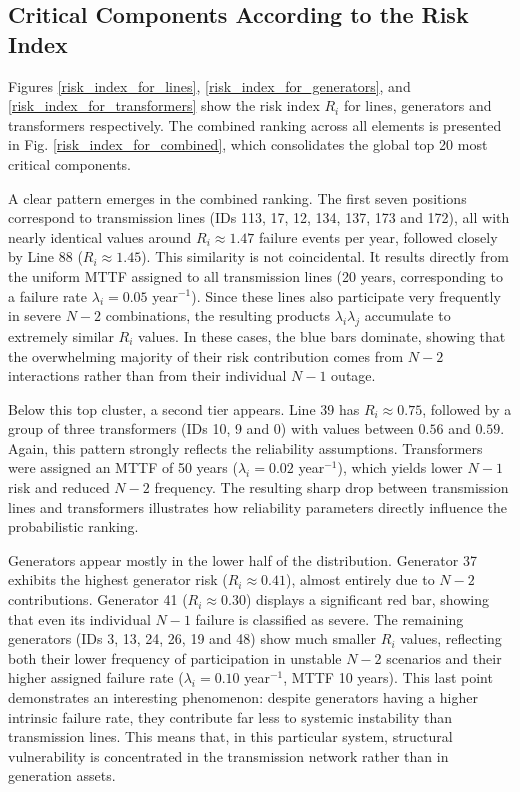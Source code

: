 \documentclass[journal]{IEEEtran}
\begin{document}
\subsection{Critical Components According to the Risk Index}

Figures \ref{risk_index_for_lines}, \ref{risk_index_for_generators}, and \ref{risk_index_for_transformers} show the risk index $R_i$ for lines, generators and transformers respectively. The combined ranking across all elements is presented in Fig. \ref{risk_index_for_combined}, which consolidates the global top 20 most critical components.

A clear pattern emerges in the combined ranking. The first seven positions correspond to transmission lines (IDs 113, 17, 12, 134, 137, 173 and 172), all with nearly identical values around $R_i \approx \num{1.47}$ failure events per year, followed closely by Line 88 ($R_i \approx \num{1.45}$). This similarity is not coincidental. It results directly from the uniform MTTF assigned to all transmission lines (20 years, corresponding to a failure rate $\lambda_i = 0.05$ year$^{-1}$). Since these lines also participate very frequently in severe $N-2$ combinations, the resulting products $\lambda_i \lambda_j$ accumulate to extremely similar $R_i$ values. In these cases, the blue bars dominate, showing that the overwhelming majority of their risk contribution comes from $N-2$ interactions rather than from their individual $N-1$ outage.

Below this top cluster, a second tier appears. Line 39 has $R_i \approx 0.75$, followed by a group of three transformers (IDs 10, 9 and 0) with values between $0.56$ and $0.59$. Again, this pattern strongly reflects the reliability assumptions. Transformers were assigned an MTTF of 50 years ($\lambda_i = 0.02$ year$^{-1}$), which yields lower $N-1$ risk and reduced $N-2$ frequency. The resulting sharp drop between transmission lines and transformers illustrates how reliability parameters directly influence the probabilistic ranking.

Generators appear mostly in the lower half of the distribution. Generator 37 exhibits the highest generator risk ($R_i \approx \num{0.41}$), almost entirely due to $N-2$ contributions. Generator 41 ($R_i \approx \num{0.30}$) displays a significant red bar, showing that even its individual $N-1$ failure is classified as severe. The remaining generators (IDs 3, 13, 24, 26, 19 and 48) show much smaller $R_i$ values, reflecting both their lower frequency of participation in unstable $N-2$ scenarios and their higher assigned failure rate ($\lambda_i = 0.10$ year$^{-1}$, MTTF 10 years). This last point demonstrates an interesting phenomenon: despite generators having a higher intrinsic failure rate, they contribute far less to systemic instability than transmission lines. This means that, in this particular system, structural vulnerability is concentrated in the transmission network rather than in generation assets.
\end{document}
